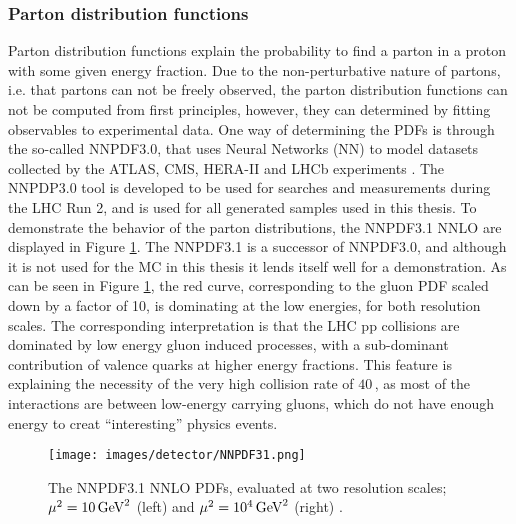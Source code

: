 \subsubsection*{Parton distribution functions}
\noindent
\justify
Parton distribution functions explain the probability to find a parton in a proton with some given energy fraction. 
Due to the non-perturbative nature of partons, i.e. that partons can not be freely observed, the parton distribution functions can not be computed from first principles, however, they can determined by fitting observables to experimental data. 
One way of determining the PDFs is through the so-called NNPDF3.0, that uses Neural Networks (NN) to model datasets collected by the ATLAS, CMS, HERA-II and LHCb experiments \cite{Ball:2014uwa}. 
The NNPDP3.0 tool is developed to be used for searches and measurements during the LHC Run 2, and is used for all generated samples used in this thesis. 
To demonstrate the behavior of the parton distributions, the NNPDF3.1 NNLO are displayed in Figure \ref{fig:NNPDF31}. 
The NNPDF3.1 is a successor of NNPDF3.0, and although it is not used for the MC in this thesis it lends itself well for a demonstration. 
As can be seen in Figure \ref{fig:NNPDF31}, the red curve, corresponding to the gluon PDF scaled down by a factor of 10, is dominating at the low energies, for both resolution scales. 
The corresponding interpretation is that the LHC pp collisions are dominated by low energy gluon induced processes, with a sub-dominant contribution of valence quarks at higher energy fractions. 
This feature is explaining the necessity of the very high collision rate of $40\,$\MHz, as most of the interactions are between low-energy carrying gluons, which do not have enough energy to creat ``interesting'' physics events.  
\begin{figure}[!htp]
  \centering
   \texttt{[image: images/detector/NNPDF31.png]}
   \caption{The NNPDF3.1 NNLO PDFs, evaluated at two resolution scales; $\mu^{2}=10\,\text{Ge\hspace{-.08em}V}^{2}$ (left) and  $\mu^{2}=10^{4}\,\text{Ge\hspace{-.08em}V}^{2}$ (right) \cite{Ball:2017nwa}.}
   \label{fig:NNPDF31}
\end{figure}
